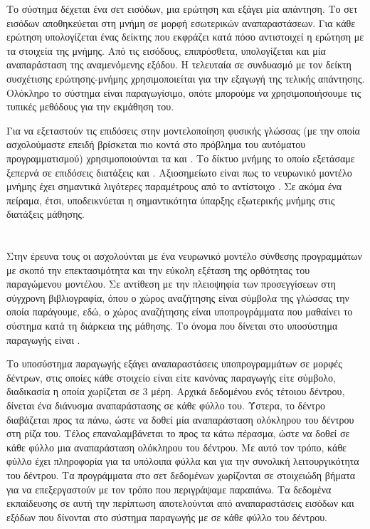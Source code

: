 Το σύστημα δέχεται ένα σετ εισόδων, μια ερώτηση και εξάγει μία απάντηση. 
Το σετ εισόδων αποθηκεύεται στη μνήμη σε μορφή εσωτερικών αναπαραστάσεων. Για κάθε ερώτηση υπολογίζεται ένας δείκτης που εκφράζει κατά πόσο αντιστοιχεί η ερώτηση με τα στοιχεία της μνήμης.
Από τις εισόδους, επιπρόσθετα, υπολογίζεται και μία αναπαράσταση της αναμενόμενης εξόδου.
Η τελευταία σε συνδυασμό με τον δείκτη συσχέτισης ερώτησης-μνήμης χρησιμοποιείται για την εξαγωγή της τελικής απάντησης. Ολόκληρο το σύστημα είναι παραγωγίσιμο, οπότε μπορούμε να χρησιμοποιήσουμε τις τυπικές μεθόδους για την εκμάθηση του.

Για να εξεταστούν τις επιδόσεις στην μοντελοποίηση φυσικής γλώσσας (με την οποία ασχολούμαστε επειδή βρίσκεται πιο κοντά στο πρόβλημα του αυτόματου προγραμματισμού) χρησιμοποιούνται τα  και . Το δίκτυο μνήμης το οποίο εξετάσαμε ξεπερνά σε επιδόσεις διατάξεις  και . Αξιοσημείωτο είναι πως το νευρωνικό μοντέλο μνήμης έχει σημαντικά λιγότερες παραμέτρους από το αντίστοιχο . Σε ακόμα ένα πείραμα, έτσι, υποδεικνύεται η σημαντικότητα ύπαρξης εξωτερικής μνήμης στις διατάξεις μάθησης.

\section{}

Στην έρευνα τους οι  \cite{Parisotto2017} ασχολούνται με ένα νευρωνικό μοντέλο σύνθεσης προγραμμάτων με σκοπό την επεκτασιμότητα και την εύκολη εξέταση της ορθότητας του παραγώμενου μοντέλου.
Σε αντίθεση με την πλειοψηφία των προσεγγίσεων στη σύγχρονη βιβλιογραφία, όπου ο χώρος αναζήτησης είναι σύμβολα της γλώσσας την οποία παράγουμε, εδώ, ο χώρος αναζήτησης είναι υποπρογράμματα που μαθαίνει το σύστημα κατά τη διάρκεια της μάθησης. Το όνομα που δίνεται στο υποσύστημα παραγωγής είναι .


Το υποσύστημα παραγωγής εξάγει αναπαραστάσεις υποπρογραμμάτων σε μορφές δέντρων, στις οποίες κάθε στοιχείο είναι είτε κανόνας παραγωγής είτε σύμβολο, διαδικασία η οποία χωρίζεται σε 3 μέρη.
Αρχικά δεδομένου ενός τέτοιου δέντρου, δίνεται ένα διάνυσμα αναπαράστασης σε κάθε φύλλο του.
Ύστερα, το δέντρο διαβάζεται προς τα πάνω, ώστε να δοθεί μία αναπαράσταση ολόκληρου του δέντρου στη ρίζα του.
Τέλος επαναλαμβάνεται το προς τα κάτω πέρασμα, ώστε να δοθεί σε κάθε φύλλο μια αναπαράσταση ολόκληρου του δέντρου.
Με αυτό τον τρόπο, κάθε φύλλο έχει πληροφορία για τα υπόλοιπα φύλλα και για την συνολική λειτουργικότητα του δέντρου. Τα προγράμματα στο σετ δεδομένων χωρίζονται σε στοιχειώδη βήματα για να επεξεργαστούν με τον τρόπο που περιγράψαμε παραπάνω. Τα δεδομένα εκπαίδευσης σε αυτή την περίπτωση αποτελούνται από αναπαραστάσεις εισόδων και εξόδων που δίνονται στο σύστημα παραγωγής με σε κάθε φύλλο του δέντρου.

